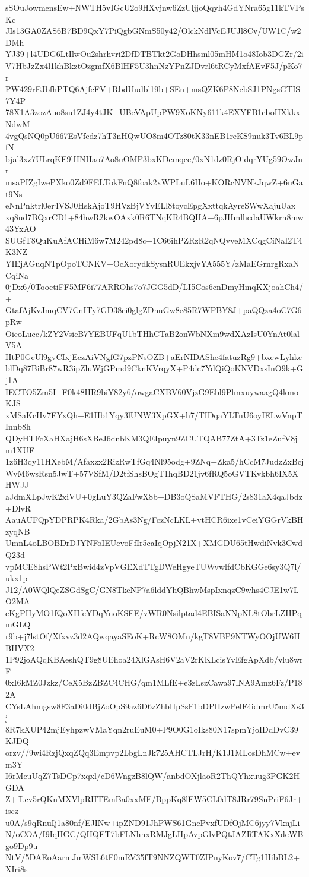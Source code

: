 sSOuJowmensEw+NWTH5vIGcU2o9HXvjnw6ZzUljjoQqyh4GdYNra65g11kTVPsKc
JIs13GA0ZAS6B7BD9QxY7PiQgbGNmS50y42/OlckNdlVcEJUJl8Cv/UW1C/w2DMh
YJ39+l4UDG6LtIlwOu2shrhvri2DfDTBTkt2GoDHhsml05mHM1o48Iob3DGZr/2i
V7HbJzZx4l1khBkztOzgmfX6BlHF5U3hnNzYPnZJDvrl6tRCyMxfAEvF5J/pKo7r
PW429rEJbfhPTQ6AjfcFV+RbdUudbl19b+SEn+msQZK6P8NcbSJ1PNgsGTIS7Y4P
78X1A3zozAuo8su1ZJ4y4tJK+UBeVApUpPW9XoKNy611k4EXYFB1cboHXkkxNdwM
4vgQsNQ0pU667EsVfcdz7hT3nHQwUO8m4OTz80tK33nEB1reKS9nuk3Tv6BL9pfN
bjal3xz7ULrqKE9lHNHao7Ao8uOMP3bxKDemqcc/0xN1dz0RjOidqrYUg59OwJnr
msaPIZgIwePXko0Zd9FELTokFnQ8foak2xWPLuL6Ho+KORcNVNkJqwZ+6uGat9Ns
eNnPnktrl0er4VSJ0HskAjoT9HVzBjVYvELl8toycEpgXxttqkAyreSWwXajuUax
xq8ud7BQxrCD1+84hwR2kwOAxk0R6TNqKR4BQHA+6pJHmlhcdaUWkrn8mw43YxAO
SUGfT8QuKuAfACHiM6w7M242pd8c+1C66ihPZRzR2qNQvveMXCqgCiNaI2T4K3NZ
YIEjAGuqNTpOpoTCNKV+OcXorydkSysnRUEkxjvYA555Y/zMaEGrnrgRxaNCqiNa
0jDx6/0TooctiFF5MF6i77ARROhs7o7JGG5dD/LI5Cos6cnDmyHmqKXjoahCh4/+
GtafAjKvJmqCV7CnITy7GD38ei0glgZDnuGw8e85R7WPBY8J+paQQza4oC7G6pRw
OieoLucc/kZY2VsieB7YEBUFqU1bTHhCTaB2onWbNXm9wdXAzIsU0YnAt0lalV5A
HtP0GcUl9gvCIxjEczAiVNgfG7pzPNsOZB+aErNIDAShe4fatuzRg9+bxewLyhkc
blDq87BiBr87wR3ipZluWjGPmd9CknKVrqyX+P4dc7YdQiQoKNVDxsInO9k+Gj1A
IECTO5Zm5I+F0k48HR9biY82y6/owgaCXBV60VjzG9Ebl9PlmxuywaagQ4kmoKJS
xMSaKcHv7EYxQh+E1Hb1Yqy3lUNW3XpGX+h7/TIDqaYLTnU6oyIELwVnpTInnb8h
QDyHTFcXaHXajH6sXBeJ6dnbKM3QEIpuyn9ZCUTQAB77ZtA+3Tz1eZufV8jm1XUF
1z6H3qy11HXebM/Afaxzx2RizRwTfGq4Nl95odg+9ZNq+Zka5/hCcM7JudzZxBcj
WvM6wsRsn5JwT+57VSfM/D2tfShsBOgT1hqBD21jv6fRQ5oGVTKvkbh6IX5XHWJJ
aJdmXLpJwK2xiVU+0gLuY3QZaFwX8b+DB3oQSaMVFTHG/2s831aX4qaJbdz+DlvR
AauAUFQpYDPRPK4Rka/2GbAs3Ng/FczNcLKL+vtHCR6ixe1vCeiYGGrVkBHzyqNB
UmnL4oLBOBDrDJYNFoIEUcvoFfIr5caIqOpjN21X+XMGDU65tHwdiNvk3CwdQ23d
vpMCE8hsPWt2PxBwid4zVpVGEXdTTgDWeHgyeTUWvwlfdCbKGGe6sy3Q7l/ukx1p
J12/A0WQlQeZSGdSgC/GN8TkeNP7a6lddYhQBhwMspIxnqzC9whs4CJE1w7LO2MA
cKgPHyMO1fQoXHfeYDqYnoKSFE/vWR0Nsilptad4EBISaNNpNL8tObrLZHPqmGLQ
r9b+j7lstOf/Xfxvz3d2AQwqayaSEoK+RcW8OMn/kgT8VBP9NTWyOOjUW6HBHVX2
1P92joAQqKBAeshQT9g8UEhoa24XlGAsH6V2aV2rKKLcisYvEfgApXdb/vlu8wrF
0xI6kMZ0Jzkz/CeX5BzZBZC4CHG/qm1MLfE+e3zLszCawa97lNA9Amz6Fz/P182A
CYsLAhmgsw8F3aDi0dBjZoOpS9az6D6zZhbHpSsF1bDPHzwPelF4idmrU5mdXs3j
8R7kXUP42mjEyhpzwVMaYqn2ruEuM0+P9O0G1oIks80N17spmYjoIDdDvC39KJDQ
orzv//9wi4RzjQxqZQq3Empvp2LbgLnJk725AHCTLJrH/K1J1MLosDhMCw+evm3Y
I6rMeuUqZ7TsDCp7xqxl/cD6WngzB8lQW/anbdOXjlaoR2ThQYhxuug3PGK2HGDA
Z+fLcv5rQKnMXVlpRHTEmBa0xxMF/BppKq8lEW5CL0dT8JRr79SuPriF6Jr+iscz
u0A/s9qRnuIj1a80nf/EJINw+ipZND91JhPWS61GncPvxfUDfOjMC6jyy7VknjLi
N/oCOA/I9IqHGC/QHQET7bFLNhnxRMJgLHpAvpGlvPQtJAZRTAKxXdeWBgo9Dp9u
NtV/5DAEoAarmJmWSL6tF0mRV35fT9NNZQWT0ZIPnyKov7/CTg1HibBL2+XIri8s
